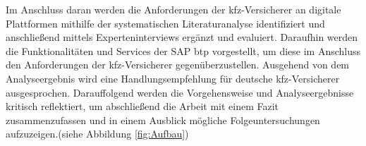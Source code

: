 Im Anschluss daran werden die Anforderungen der \ac{kfz}-Versicherer an digitale Plattformen mithilfe der systematischen Literaturanalyse identifiziert und anschließend mittels Experteninterviews ergänzt und evaluiert. Daraufhin werden die Funktionalitäten und Services der SAP \ac{btp} vorgestellt, um diese im Anschluss den Anforderungen der \ac{kfz}-Versicherer gegenüberzustellen. Ausgehend von dem Analyseergebnis wird eine Handlungsempfehlung für deutsche \ac{kfz}-Versicherer ausgesprochen. Darauffolgend werden die Vorgehensweise und Analyseergebnisse kritisch reflektiert, um abschließend die Arbeit mit einem Fazit zusammenzufassen und in einem Ausblick mögliche Folgeuntersuchungen aufzuzeigen.(siehe Abbildung \ref{fig:Aufbau})




\newpage